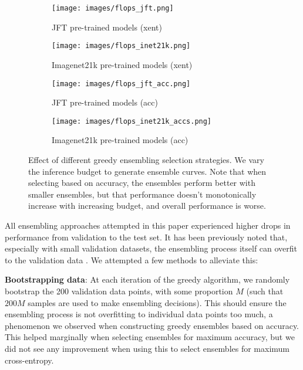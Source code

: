 \documentclass{article} \usepackage{iclr2021_conference,times}
\begin{document}
\begin{figure}[tb]
\centering
\begin{subfigure}{0.64\textwidth}
  \centering
  \texttt{[image: images/flops\_jft.png]}
  \caption{JFT pre-trained models (xent)}
  \label{fig:flops_jft_xent}
\end{subfigure}\begin{subfigure}{.33\textwidth}
  \centering
  \texttt{[image: images/flops\_inet21k.png]}
  \caption{Imagenet21k pre-trained models (xent)}
  \label{fig:flops_inet21k_xent}
\end{subfigure}
\begin{subfigure}{0.64\textwidth}
  \centering
  \texttt{[image: images/flops\_jft\_acc.png]}
  \caption{JFT pre-trained models (acc)}
  \label{fig:flops_jft_acc}
\end{subfigure}\begin{subfigure}{.33\textwidth}
  \centering
  \texttt{[image: images/flops\_inet21k\_accs.png]}
  \caption{Imagenet21k pre-trained models (acc)}
  \label{fig:flops_inet21k_acc}
\end{subfigure}
\caption{Effect of different greedy ensembling selection strategies. We vary the inference budget to generate ensemble curves. Note that when selecting based on accuracy, the ensembles perform better with smaller ensembles, but that performance doesn't monotonically increase with increasing budget, and overall performance is worse.}
\label{fig:xent_vs_acc}
\end{figure}

All ensembling approaches attempted in this paper experienced higher drops in performance from validation to the test set. It has been previously noted that, especially with small validation datasets, the ensembling process itself can overfit to the validation data \citep{caruana2004ensembleselection}. We attempted a few methods to alleviate this:

\textbf{Bootstrapping data}:
    At each iteration of the greedy algorithm, we randomly bootstrap the 200 validation data points, with some proportion $M$ (such that $200M$ samples are used to make ensembling decisions). This should ensure the ensembling process is not overfitting to individual data points too much, a phenomenon we observed when constructing greedy ensembles based on accuracy.
    This helped marginally when selecting ensembles for maximum accuracy, but we did not see any improvement when using this to select ensembles for maximum cross-entropy.
    
\end{document}
